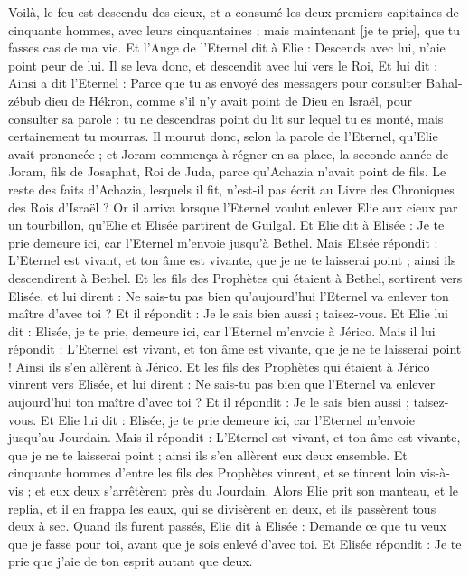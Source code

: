 \begin{multicols}{2}
Voilà, le feu est descendu des cieux, et a consumé les deux premiers capitaines de cinquante hommes, avec leurs cinquantaines ; mais maintenant [je te prie], que tu fasses cas de ma vie.
Et l'Ange de l'Eternel dit à Elie : Descends avec lui, n'aie point peur de lui. Il se leva donc, et descendit avec lui vers le Roi,
Et lui dit : Ainsi a dit l'Eternel : Parce que tu as envoyé des messagers pour consulter Bahal-zébub dieu de Hékron, comme s'il n'y avait point de Dieu en Israël, pour consulter sa parole : tu ne descendras point du lit sur lequel tu es monté, mais certainement tu mourras.
Il mourut donc, selon la parole de l'Eternel, qu'Elie avait prononcée ; et Joram commença à régner en sa place, la seconde année de Joram, fils de Josaphat, Roi de Juda, parce qu'Achazia n'avait point de fils.
Le reste des faits d'Achazia, lesquels il fit, n'est-il pas écrit au Livre des Chroniques des Rois d'Israël ?
\VerseOne{}Or il arriva lorsque l'Eternel voulut enlever Elie aux cieux par un tourbillon, qu'Elie et Elisée partirent de Guilgal.
Et Elie dit à Elisée : Je te prie demeure ici, car l'Eternel m'envoie jusqu'à Bethel. Mais Elisée répondit : L'Eternel est vivant, et ton âme est vivante, que je ne te laisserai point ; ainsi ils descendirent à Bethel.
Et les fils des Prophètes qui étaient à Bethel, sortirent vers Elisée, et lui dirent : Ne sais-tu pas bien qu'aujourd'hui l'Eternel va enlever ton maître d'avec toi ? Et il répondit : Je le sais bien aussi ; taisez-vous.
Et Elie lui dit : Elisée, je te prie, demeure ici, car l'Eternel m'envoie à Jérico. Mais il lui répondit : L'Eternel est vivant, et ton âme est vivante, que je ne te laisserai point ! Ainsi ils s'en allèrent à Jérico.
Et les fils des Prophètes qui étaient à Jérico vinrent vers Elisée, et lui dirent : Ne sais-tu pas bien que l'Eternel va enlever aujourd'hui ton maître d'avec toi ? Et il répondit : Je le sais bien aussi ; taisez-vous.
Et Elie lui dit : Elisée, je te prie demeure ici, car l'Eternel m'envoie jusqu'au Jourdain. Mais il répondit : L'Eternel est vivant, et ton âme est vivante, que je ne te laisserai point ; ainsi ils s'en allèrent eux deux ensemble.
Et cinquante hommes d'entre les fils des Prophètes vinrent, et se tinrent loin vis-à-vis ; et eux deux s'arrêtèrent près du Jourdain.
Alors Elie prit son manteau, et le replia, et il en frappa les eaux, qui se divisèrent en deux, et ils passèrent tous deux à sec.
Quand ils furent passés, Elie dit à Elisée : Demande ce que tu veux que je fasse pour toi, avant que je sois enlevé d'avec toi. Et Elisée répondit : Je te prie que j'aie de ton esprit autant que deux.

\end{multicols}
